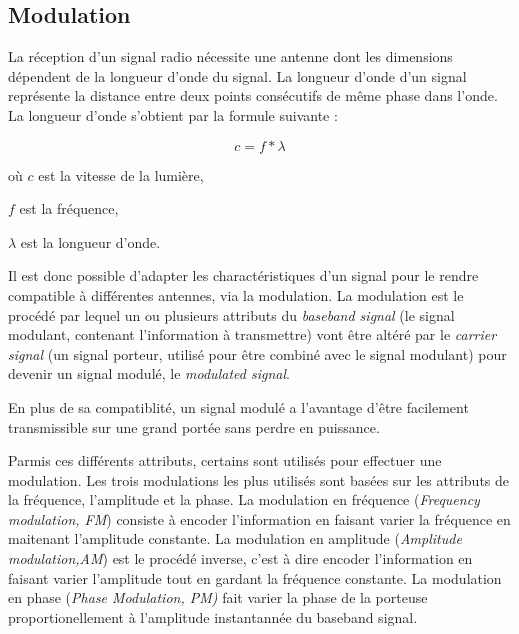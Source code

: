 \subsection{Modulation}

La réception d'un signal radio nécessite une antenne dont les dimensions dépendent de la longueur d'onde du signal. La longueur d'onde d'un signal représente la distance entre deux points consécutifs de même phase dans l'onde. La longueur d'onde s'obtient par la formule suivante :

\begin{equation}\label{eq1}
c = f * \lambda
\end{equation}

où $c$ est la vitesse de la lumière,

$f$ est la fréquence,

$\lambda$ est la longueur d'onde.

\vspace{0.1cm}

Il est donc possible d'adapter les charactéristiques d'un signal pour le rendre compatible à différentes antennes, via la modulation. La modulation est le procédé par lequel un ou plusieurs attributs du \textit{baseband signal} (le signal modulant, contenant l'information à transmettre) vont être altéré par le \textit{carrier signal} (un signal porteur, utilisé pour être combiné avec le signal modulant) pour devenir un signal modulé, le \textit{modulated signal}.

En plus de sa compatiblité, un signal modulé a l'avantage d'être facilement transmissible sur une grand portée sans perdre en puissance.

\vspace{0.1cm}

Parmis ces différents attributs, certains sont utilisés pour effectuer une modulation. Les trois modulations les plus utilisés sont basées sur les attributs de la fréquence, l'amplitude et la phase. La modulation en fréquence (\textit{Frequency modulation, FM}) consiste à encoder l'information en faisant varier la fréquence en maitenant l'amplitude constante. La modulation en amplitude (\textit{Amplitude modulation,AM}) est le procédé inverse, c'est à dire encoder l'information en faisant varier l'amplitude tout en gardant la fréquence constante. La modulation en phase (\textit{Phase Modulation, PM)} fait varier la phase de la porteuse proportionellement à l'amplitude instantannée du baseband signal.

\vspace{0.1cm}

